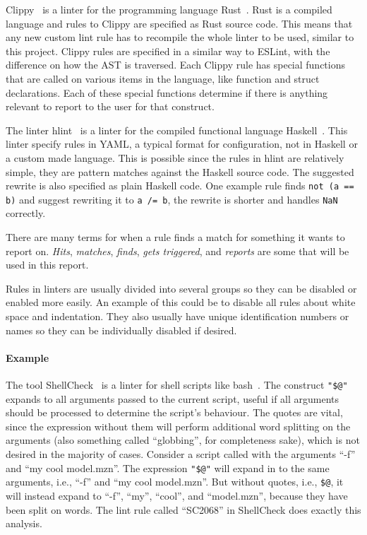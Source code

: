 \documentclass[a4paper,12pt]{article}
\begin{document}
Clippy~\cite{Clippy} is a linter for the programming language Rust~\cite{rustlang}. Rust
is a compiled language and rules to Clippy are specified as Rust source code. This means
that any new custom lint rule has to recompile the whole linter to be used, similar to
this project. Clippy rules are specified in a similar way to ESLint, with the difference
on how the AST is traversed. Each Clippy rule has special functions that are called on
various items in the language, like function and struct declarations. Each of these
special functions determine if there is anything relevant to report to the user for that
construct.

The linter hlint~\cite{hlint} is a linter for the compiled functional language
Haskell~\cite{haskell}. This linter specify rules in YAML, a typical format for
configuration, not in Haskell or a custom made language. This is possible since the rules
in hlint are relatively simple, they are pattern matches against the Haskell source code.
The suggested rewrite is also specified as plain Haskell code. One example rule finds
\texttt{not (a == b)} and suggest rewriting it to \texttt{a /= b}, the rewrite is shorter
and handles \texttt{NaN} correctly.

There are many terms for when a rule finds a match for something it wants to report on.
\emph{Hits}, \emph{matches}, \emph{finds}, \emph{gets triggered}, and \emph{reports} are
some that will be used in this report.

Rules in linters are usually divided into several groups so they can be disabled or
enabled more easily. An example of this could be to disable all rules about white space
and indentation. They also usually have unique identification numbers or names so they can
be individually disabled if desired.

\paragraph{Example}
The tool ShellCheck~\cite{shellcheck} is a linter for shell scripts like
bash~\cite{bash}. The construct \texttt{"\$@"} expands to all arguments passed to the
current script, useful if all arguments should be processed to determine the script's
behaviour. The quotes are vital, since the expression without them will perform additional
word splitting on the arguments (also something called ``globbing'', for completeness
sake), which is not desired in the majority of cases. Consider a script called with the
arguments ``-f'' and ``my cool model.mzn''. The expression \texttt{"\$@"} will expand in
to the same arguments, i.e., ``-f'' and ``my cool model.mzn''. But without quotes, i.e.,
\texttt{\$@}, it will instead expand to ``-f'', ``my'', ``cool'', and ``model.mzn'', because they
have been split on words. The lint
rule called ``SC2068'' in ShellCheck does exactly this analysis.
\end{document}
